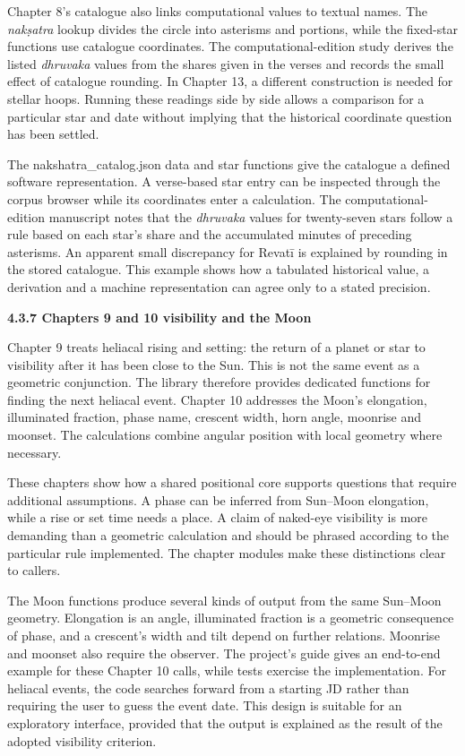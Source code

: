 \documentclass[
]{article}
\begin{document}
Chapter 8's catalogue also links computational values to textual names.
The \emph{nakṣatra} lookup divides the circle into asterisms and
portions, while the fixed-star functions use catalogue coordinates. The
computational-edition study derives the listed \emph{dhruvaka} values
from the shares given in the verses and records the small effect of
catalogue rounding. In Chapter 13, a different construction is needed
for stellar hoops. Running these readings side by side allows a
comparison for a particular star and date without implying that the
historical coordinate question has been settled.

The nakshatra\_catalog.json data and star functions give the catalogue a
defined software representation. A verse-based star entry can be
inspected through the corpus browser while its coordinates enter a
calculation. The computational-edition manuscript notes that the
\emph{dhruvaka} values for twenty-seven stars follow a rule based on
each star's share and the accumulated minutes of preceding asterisms. An
apparent small discrepancy for Revatī is explained by rounding in the
stored catalogue. This example shows how a tabulated historical value, a
derivation and a machine representation can agree only to a stated
precision.

\textbf{4.3.7 Chapters 9 and 10 visibility and the Moon}

Chapter 9 treats heliacal rising and setting: the return of a planet or
star to visibility after it has been close to the Sun. This is not the
same event as a geometric conjunction. The library therefore provides
dedicated functions for finding the next heliacal event. Chapter 10
addresses the Moon's elongation, illuminated fraction, phase name,
crescent width, horn angle, moonrise and moonset. The calculations
combine angular position with local geometry where necessary.

These chapters show how a shared positional core supports questions that
require additional assumptions. A phase can be inferred from Sun--Moon
elongation, while a rise or set time needs a place. A claim of naked-eye
visibility is more demanding than a geometric calculation and should be
phrased according to the particular rule implemented. The chapter
modules make these distinctions clear to callers.

The Moon functions produce several kinds of output from the same
Sun--Moon geometry. Elongation is an angle, illuminated fraction is a
geometric consequence of phase, and a crescent's width and tilt depend
on further relations. Moonrise and moonset also require the observer.
The project's guide gives an end-to-end example for these Chapter 10
calls, while tests exercise the implementation. For heliacal events, the
code searches forward from a starting JD rather than requiring the user
to guess the event date. This design is suitable for an exploratory
interface, provided that the output is explained as the result of the
adopted visibility criterion.
\end{document}
